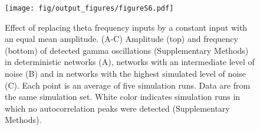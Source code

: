 \documentclass[a4paper,12pt]{article}
\newcommand{\ssc}[3]{\ensuremath{#1_{\text{#2}_{\text{#3}}}}}
\newcommand{\gE      }{\ssc{g}      {\scriptsize{E}}{}}
\newcommand{\gI      }{\ssc{g}      {\scriptsize{I}}{}}
\begin{document}
%
%
%


\setcounter{figure}{0}
\renewcommand{\figurename}{Figure 6 - figure supplement}

\begin{figure}[ht!]
    \internallinenumbers
    \centering
        \texttt{[image: fig/output\_figures/figureS6.pdf]}
    \caption{Effect of replacing theta frequency inputs by a constant input
    with an equal mean amplitude. (A-C) Amplitude (top) and frequency (bottom)
    of detected gamma oscillations (Supplementary Methods) in deterministic
    networks (A), networks with an intermediate level of noise (B) and in
    networks with the highest simulated level of noise (C). Each point is an
    average of five simulation runs. Data are from the same simulation set.
    White color indicates simulation runs in which no autocorrelation peaks
    were detected (Supplementary Methods).}
\end{figure}
\end{document}
